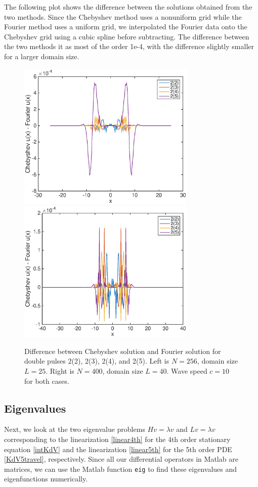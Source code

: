 \documentclass[12pt]{article}
\begin{document}
The following plot shows the difference between the solutions obtained from the two methods. Since the Chebyshev method uses a nonuniform grid while the Fourier method uses a uniform grid, we interpolated the Fourier data onto the Chebyshev grid using a cubic spline before subtracting. The difference between the two methods it as most of the order 1e-4, with the difference slightly smaller for a larger domain size.

\begin{figure}[H]
	\includegraphics[width=8.5cm]{chebfourdiff.eps}
	\includegraphics[width=8.5cm]{chebfourdiff40.eps}
	\caption{Difference between Chebyshev solution and Fourier solution for double pulses 2(2), 2(3), 2(4), and 2(5). Left is $N = 256$, domain size $L = 25$. Right is $N = 400$, domain size $L = 40$. Wave speed $c = 10$ for both cases.}
\end{figure}

\subsection{Eigenvalues}

Next, we look at the two eigenvalue problems $Hv = \lambda v$ and $Lv = \lambda v$ corresponding to the linearization \eqref{linear4th} for the 4th order stationary equation \eqref{intKdV} and the linearization \eqref{linear5th} for the 5th order PDE \eqref{KdV5travel}, respectively. Since all our differential operators in Matlab are matrices, we can use the Matlab function \texttt{eig} to find these eigenvalues and eigenfunctions numerically. \\
\end{document}
